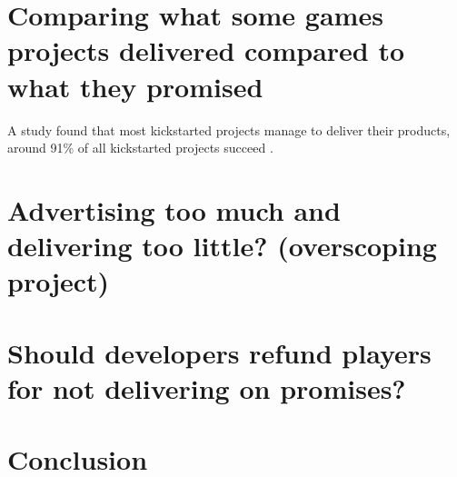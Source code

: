 \documentclass{scrartcl}
\begin{document}
\section{Comparing what some games projects delivered compared to what they promised}

A study found that most kickstarted projects manage to deliver their products, around 91\% of all kickstarted projects succeed \cite{mollick2015}.


\section{Advertising too much and delivering too little? (overscoping project)}

\cite{qiu2013}

\section{Should developers refund players for not delivering on promises?}

\section{Conclusion}




\end{document}
